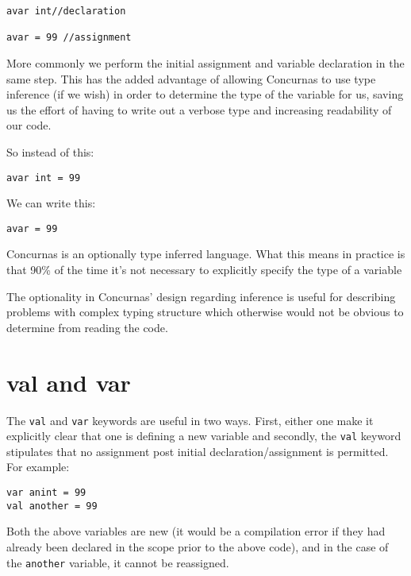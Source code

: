 \documentclass[conc-doc]{subfiles}
\begin{document}
\begin{lstlisting}
avar int//declaration

avar = 99 //assignment
\end{lstlisting}

More commonly we perform the initial assignment and variable declaration in the same step. This has the added advantage of allowing Concurnas to use type inference (if we wish) in order to determine the type of the variable for us, saving us the effort of having to write out a verbose type and increasing readability of our code. 

So instead of this:
\begin{lstlisting}
avar int = 99
\end{lstlisting}

We can write this:

\begin{lstlisting}
avar = 99
\end{lstlisting}

Concurnas is an optionally type inferred language. What this means in practice is that 90\% of the time it's not necessary to explicitly specify the type of a variable

The optionality in Concurnas' design regarding inference is useful for describing problems with complex typing structure which otherwise would not be obvious to determine from reading the code.

\section{val and var}
The \lstinline{val} and \lstinline{var} keywords are useful in two ways. First, either one make it explicitly clear that one is defining a new variable and secondly, the \lstinline{val} keyword stipulates that no assignment post initial declaration/assignment is permitted. For example:

\begin{lstlisting}
var anint = 99
val another = 99
\end{lstlisting}

Both the above variables are new (it would be a compilation error if they had already been declared in the scope prior to the above code), and in the case of the \lstinline{another} variable, it cannot be reassigned.
\end{document}
